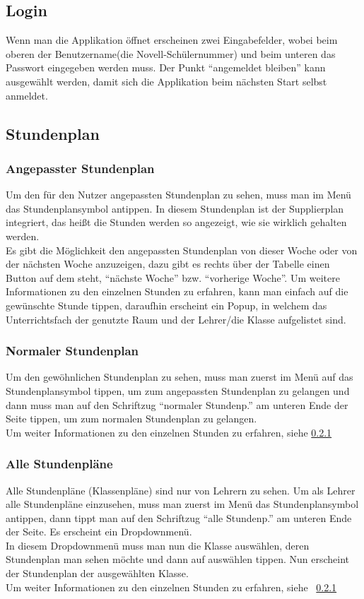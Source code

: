 \subsection{Login}
Wenn man die Applikation öffnet erscheinen zwei Eingabefelder, wobei beim oberen der Benutzername(die Novell-Schülernummer) und beim unteren das Passwort eingegeben werden muss. Der Punkt \enquote{angemeldet bleiben} kann ausgewählt werden, damit sich die Applikation beim nächsten Start selbst anmeldet. 

\subsection{Stundenplan}
\subsubsection{Angepasster Stundenplan}
\label{sec:angepasster_stundenplan}
Um den für den Nutzer angepassten Stundenplan zu sehen, muss man im Menü das Stundenplansymbol antippen. In diesem Stundenplan ist der Supplierplan integriert, das heißt die Stunden werden so angezeigt, wie sie wirklich gehalten werden.\\
Es gibt die Möglichkeit den angepassten Stundenplan von dieser Woche oder von der nächsten Woche anzuzeigen, dazu gibt es rechts über der Tabelle einen Button auf dem steht, \enquote{nächste Woche} bzw. \enquote{vorherige Woche}.
Um weitere Informationen zu den einzelnen Stunden zu erfahren, kann man einfach auf die gewünschte Stunde tippen, daraufhin erscheint ein Popup, in welchem das Unterrichtsfach der genutzte Raum und der Lehrer/die Klasse aufgelistet sind.

\subsubsection{Normaler Stundenplan}
Um den gewöhnlichen Stundenplan zu sehen, muss man zuerst im Menü auf das Stundenplansymbol tippen, um zum angepassten Stundenplan zu gelangen und dann muss man auf den Schriftzug \enquote{normaler Stundenp.} am unteren Ende der Seite tippen, um zum normalen Stundenplan zu gelangen.\\
Um weiter Informationen zu den einzelnen Stunden zu erfahren, siehe \ref{sec:angepasster_stundenplan}

\subsubsection{Alle Stundenpläne}
Alle Stundenpläne (Klassenpläne) sind nur von Lehrern zu sehen. Um als Lehrer alle Stundenpläne einzusehen, muss man zuerst im Menü das Stundenplansymbol antippen, dann tippt man auf den Schriftzug \enquote{alle Stundenp.} am unteren Ende der Seite. Es erscheint ein Dropdownmenü.\\
In diesem Dropdownmenü muss man nun die Klasse auswählen, deren Stundenplan man sehen möchte und dann auf auswählen tippen. Nun erscheint der Stundenplan der ausgewählten Klasse.\\
Um weiter Informationen zu den einzelnen Stunden zu erfahren, siehe ~\ref{sec:angepasster_stundenplan}


